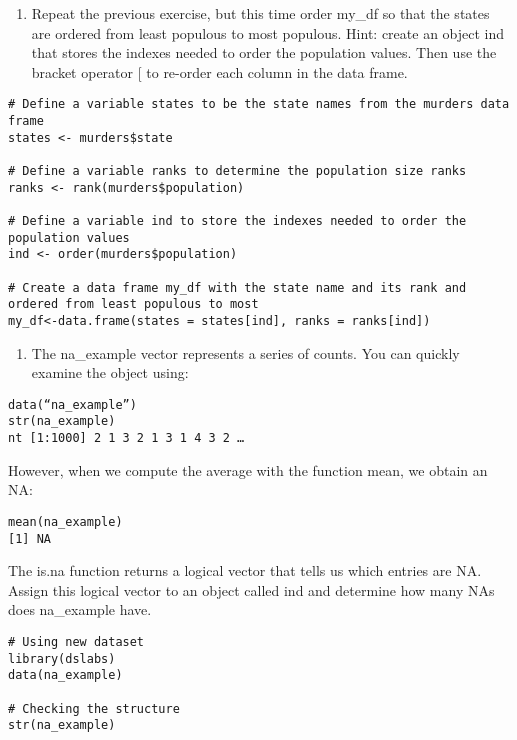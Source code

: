 \documentclass[
]{article}
\providecommand{\tightlist}{%
  \setlength{\itemsep}{0pt}\setlength{\parskip}{0pt}}
\begin{document}
\begin{enumerate}
\def\labelenumi{\arabic{enumi}.}
\setcounter{enumi}{5}
\tightlist
\item
  Repeat the previous exercise, but this time order my\_df so that the
  states are ordered from least populous to most populous. Hint: create
  an object ind that stores the indexes needed to order the population
  values. Then use the bracket operator {[} to re-order each column in
  the data frame.
\end{enumerate}

\begin{verbatim}
# Define a variable states to be the state names from the murders data frame
states <- murders$state

# Define a variable ranks to determine the population size ranks 
ranks <- rank(murders$population)

# Define a variable ind to store the indexes needed to order the population values
ind <- order(murders$population)

# Create a data frame my_df with the state name and its rank and ordered from least populous to most 
my_df<-data.frame(states = states[ind], ranks = ranks[ind])
\end{verbatim}

\begin{enumerate}
\def\labelenumi{\arabic{enumi}.}
\setcounter{enumi}{6}
\tightlist
\item
  The na\_example vector represents a series of counts. You can quickly
  examine the object using:
\end{enumerate}

\begin{verbatim}
data(“na_example”)
str(na_example)
nt [1:1000] 2 1 3 2 1 3 1 4 3 2 …
\end{verbatim}

However, when we compute the average with the function mean, we obtain
an NA:

\begin{verbatim}
mean(na_example)
[1] NA
\end{verbatim}

The is.na function returns a logical vector that tells us which entries
are NA. Assign this logical vector to an object called ind and determine
how many NAs does na\_example have.

\begin{verbatim}
# Using new dataset 
library(dslabs)
data(na_example)

# Checking the structure 
str(na_example)
\end{verbatim}
\end{document}
